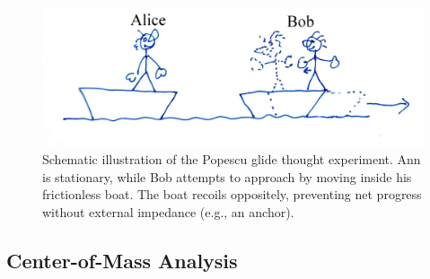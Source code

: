 \documentclass[reprint,aps,pra,superscriptaddress,longbibliography]{revtex4-2}
\begin{document}
\begin{figure}[htbp]
    \centering
    \includegraphics[width=0.8\columnwidth]{2025-wind-f-AliceBobPopescu.jpg}
    \caption{Schematic illustration of the Popescu glide thought experiment. Ann is stationary, while Bob attempts to approach by moving inside his frictionless boat. The boat recoils oppositely, preventing net progress without external impedance (e.g., an anchor).}
    \label{fig:popescu-glide}
\end{figure}

\subsection{Center-of-Mass Analysis}
\end{document}
